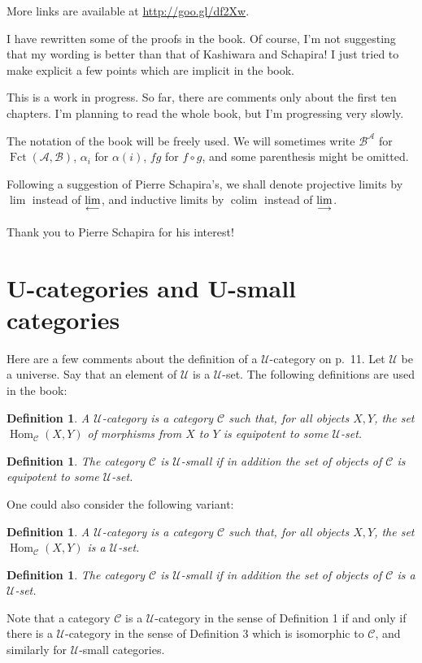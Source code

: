 \documentclass[12pt]{article}
\newtheorem{df}[thm]{Definition}%
\theoremstyle{remark}%
\newcommand{\A}{\mathcal A}
\newcommand{\B}{\mathcal B}
\newcommand{\C}{\mathcal C}
\newcommand{\U}{\mathcal U}
\newcommand{\ilim}{\operatornamewithlimits{\underset{\longrightarrow}{lim}}}
\newcommand{\plim}{\operatornamewithlimits{\underset{\longleftarrow}{lim}}}
\DeclareMathOperator*{\coli}{colim}
\DeclareMathOperator{\Fct}{Fct}
\DeclareMathOperator{\Hom}{Hom}
\begin{document}
More links are available at \href{http://goo.gl/df2Xw}{http://goo.gl/df2Xw}.

I have rewritten some of the proofs in the book. Of course, I'm not suggesting that my wording is better than that of Kashiwara and Schapira! I just tried to make explicit a few points which are implicit in the book. 

This is a work in progress. So far, there are comments only about the first ten chapters. I'm planning to read the whole book, but I'm progressing very slowly.

The notation of the book will be freely used. We will sometimes write $\B^\A$ for $\Fct(\A,\B)$, $\alpha_i$ for $\alpha(i)$, $fg$ for $f\circ g$, and some parenthesis might be omitted. 

Following a suggestion of Pierre Schapira's, we shall denote projective limits by $\lim$ instead of $\plim$, and inductive limits by $\coli$ instead of $\ilim$. 

Thank you to Pierre Schapira for his interest!%
%
\section{U-categories and U-small categories}\label{ucat}
% 
Here are a few comments about the definition of a $\U$-category on p.~11. Let $\U$ be a universe. Say that an element of $\U$ is a $\U$-set. The following definitions are used in the book: 
%
\begin{df} 
A $\U$-category is a category $\C$ such that, for all objects $X,Y$, the set $\Hom_\C(X,Y)$ of morphisms from $X$ to $Y$ is equipotent to some $\U$-set. 
\end{df} 
% 
\begin{df}
The category $\C$ is $\U$-small if in addition the set of objects of $\C$ is equipotent to some $\U$-set. 
\end{df} 
% 
One could also consider the following variant: 
% 
\begin{df}\label{ducat}
A $\U$-category is a category $\C$ such that, for all objects $X,Y$, the set $\Hom_\C(X,Y)$ is a $\U$-set. 
\end{df} 
% 
\begin{df}\label{small}
The category $\C$ is $\U$-small if in addition the set of objects of $\C$ is a $\U$-set. 
\end{df} 
% 
Note that a category $\C$ is a $\U$-category in the sense of Definition 1 if and only if there is a $\U$-category in the sense of Definition 3 which is isomorphic to $\C$, and similarly for $\U$-small categories.\bigskip
\end{document}
